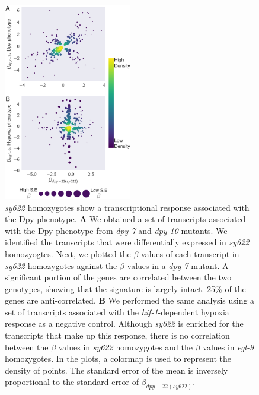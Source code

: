 \documentclass[10pt, twocolumn]{article}
\newcommand{\gene}[1]{\mbox{\emph{#1}}}
\newcommand{\dpy}{\gene{mdt-12}}
\begin{document}
\begin{figure}
  \centering{}
  \includegraphics[width=0.5\textwidth]{../figs/dpy_phenotype.pdf}
  \caption{
    \emph{sy622} homozygotes show a transcriptional response associated with the
    Dpy phenotype. \textbf{A} We obtained a set of transcripts associated with
    the Dpy phenotype from \gene{dpy-7} and \gene{dpy-10} mutants. We identified
    the transcripts that were differentially expressed in \emph{sy622}
    homozyogtes. Next, we plotted the $\beta$ values of each transcript in
    \emph{sy622} homozygotes against the $\beta$ values in a \emph{dpy-7}
    mutant. A significant portion of the genes are correlated between the two
    genotypes, showing that the signature is largely intact. 25\% of the genes
    are anti-correlated. \textbf{B} We performed the same analysis using a set
    of transcripts associated with the \gene{hif-1}-dependent hypoxia response
    as a negative control. Although \emph{sy622} is enriched for the transcripts
    that make up this response, there is no correlation between the $\beta$
    values in \emph{sy622} homozygotes and the  $\beta$ values in \emph{egl-9}
    homozygotes. In the plots, a colormap is used to represent the density of
    points. The standard error of the mean is inversely proportional to the
    standard error of $\beta_{dpy-22(sy622)}$.
    }
\label{fig:dpy_phenotype}
\end{figure}


\end{document}
